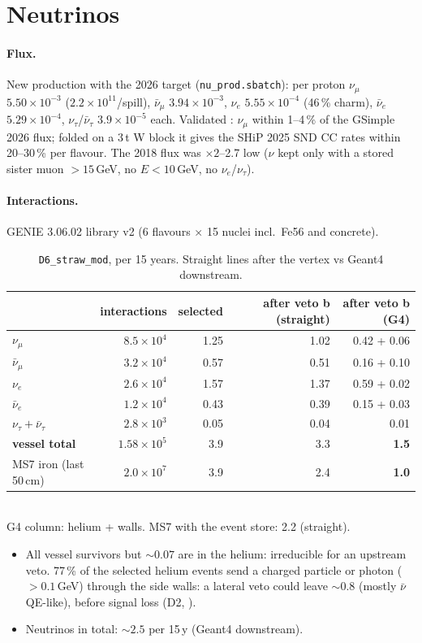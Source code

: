 \section{Neutrinos}

\paragraph{Flux.} New production with the 2026 target (\texttt{nu\_prod.sbatch}): per proton $\nu_\mu$
$5.50\times10^{-3}$ ($2.2\times10^{11}$/spill), $\bar\nu_\mu$ $3.94\times10^{-3}$, $\nu_e$ $5.55\times10^{-4}$ (46\,\%
charm), $\bar\nu_e$ $5.29\times10^{-4}$, $\nu_\tau$/$\bar\nu_\tau$ $3.9\times10^{-5}$ each. Validated \solid: $\nu_\mu$
within 1--4\,\% of the GSimple 2026 flux; folded on a 3\,t W block it gives the SHiP 2025 SND CC rates
\cite{ship2025} within 20--30\,\% per flavour. The 2018 flux was $\times2$--2.7 low ($\nu$ kept only with a stored
sister muon $>15$\,GeV, no $E<10$\,GeV, no $\nu_e$/$\nu_\tau$). 

\paragraph{Interactions.} GENIE 3.06.02 library v2 (6 flavours $\times$ 15 nuclei incl.\ Fe56 and concrete).

\begin{table}[h]
\centering\small
\caption{\texttt{D6\_straw\_mod}, per 15 years. Straight lines after the vertex vs Geant4 downstream.
}
\begin{tabular}{@{}lrrrr@{}}
\toprule
 & interactions & selected & after veto b (straight) & after veto b (G4)\\
\midrule
$\nu_\mu$ & $8.5\times10^4$ & 1.25 & 1.02 & 0.42 + 0.06\\
$\bar\nu_\mu$ & $3.2\times10^4$ & 0.57 & 0.51 & 0.16 + 0.10\\
$\nu_e$ & $2.6\times10^4$ & 1.57 & 1.37 & 0.59 + 0.02\\
$\bar\nu_e$ & $1.2\times10^4$ & 0.43 & 0.39 & 0.15 + 0.03\\
$\nu_\tau+\bar\nu_\tau$ & $2.8\times10^3$ & 0.05 & 0.04 & 0.01\\
\textbf{vessel total} & $1.58\times10^5$ & 3.9 & 3.3 & \textbf{1.5}\\
MS7 iron (last 50\,cm) & $2.0\times10^7$ & 3.9 & 2.4 & \textbf{1.0}\\
\bottomrule
\end{tabular}\\[2pt]
{\footnotesize G4 column: helium + walls. MS7 with the event store: 2.2 (straight).}
\end{table}

\begin{itemize}
\item All vessel survivors but $\sim0.07$ are in the helium: irreducible for an upstream veto. 77\,\% of the selected
helium events send a charged particle or photon ($>0.1$\,GeV) through the side walls: a lateral veto could leave
$\sim0.8$ (mostly $\bar\nu$ QE-like), before signal loss (D2, \open).
\item Neutrinos in total: $\sim2.5$ per 15\,y (Geant4 downstream).
\end{itemize}
